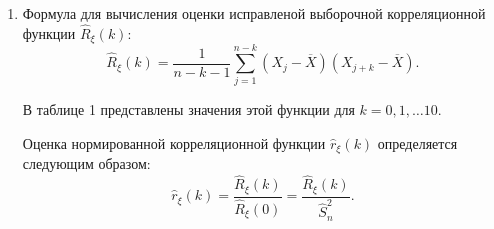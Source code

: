 \documentclass[12pt, fleqn]{article}
\begin{document}
{\begin{enumerate}
{		      	В данном случае была использована исправленная дисперсия, т.к. она даёт несмещённую оценку дисперсии:
		      	\begin{equation}
		      		M({\hat{S}^2}_n)=D_x.
		      	\end{equation}
		      			      			      			      			      			      	        
		      	Применяя формулу \eqref{disp}, получаем $\hat{S}^2_n = 45.94676$.
		      			      			      			      			      			      	        
		      	Для вычисления среднеквадратического отклонения (СКО) используется следующая формула:
		      	\begin{equation}
		      		\hat{S}_n=\sqrt{\frac{1}{n-1}\sum_{k=1}^{n}{(X_k - \overline{X})^2}}.
		      	\end{equation}
		      			      			      			      			      			      	        
		      	Принимая во внимание значение $ \hat{S}^2_n $, получаем $ \hat{S}_n = 6.77840 $.
			
			Графически изобразим фрагмент (первые 150 значений) исходного случайного процесса на рисунке 1. 

			Для нахождения верхней и нижней границ коридора наиболее вероятных значений процесса воспользуемся следующей формулой: 
			\begin{equation}
				 \overline{X} \pm \hat{S}_n = [-31.8506; -18.2938] 
			\end{equation}
			Отобразим найденные границы коридора наиболее вероятных значений случайного процесса на рисунке 1.
		      }
		\item
		      {
		      	Формула для вычисления оценки исправленой выборочной корреляционной функции $ \hat{R}_\xi(k) $:		      			      			      			      		  	
		      	\begin{equation}\label{corr_func}
		      		\hat{R}_\xi(k) = \frac{1}{n - k - 1} \sum_{j=1}^{n - k} {(X_j - \overline{X})(X_{j+k}-\overline{X})}.
		      	\end{equation}
		      			      			      			      			      			      		  	
		      	В таблице 1 представлены значения этой функции для $ k = 0,1,\dots10 $.
		      			      			      			      			      			      		  	
		      	Оценка нормированной корреляционной функции $ \hat{r}_\xi(k) $ определяется следующим образом:
		      	\begin{equation}
		      		\hat{r}_\xi(k) = \frac{\hat{R}_\xi(k)}{\hat{R}_\xi(0)} = \frac{\hat{R}_\xi(k)}{\hat{S}^2_n}.
		      	\end{equation}
		      			      			      			      			      			      		  	
}
\end{enumerate}}
\end{document}
